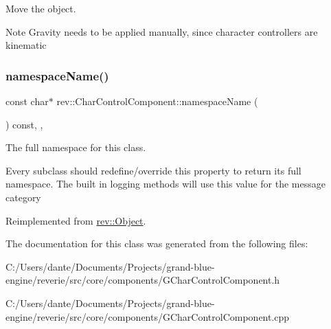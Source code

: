 Move the object. 

\begin{DoxyNote}{Note}
Gravity needs to be applied manually, since character controllers are kinematic 
\end{DoxyNote}
\mbox{\label{classrev_1_1_char_control_component_a62ac7aa35e708a0f0fcde627bababfd9}} 
\subsubsection{\texorpdfstring{namespaceName()}{namespaceName()}}
{\footnotesize\ttfamily const char$\ast$ rev\+::\+Char\+Control\+Component\+::namespace\+Name (\begin{DoxyParamCaption}{ }\end{DoxyParamCaption}) const\hspace{0.3cm}{\ttfamily [inline]}, {\ttfamily [override]}, {\ttfamily [virtual]}}



The full namespace for this class. 

Every subclass should redefine/override this property to return its full namespace. The built in logging methods will use this value for the message category 

Reimplemented from \mbox{\hyperlink{classrev_1_1_object_aaeb638d3e10f361c56c211a318a27f3d}{rev\+::\+Object}}.



The documentation for this class was generated from the following files\+:\begin{DoxyCompactItemize}
\item 
C\+:/\+Users/dante/\+Documents/\+Projects/grand-\/blue-\/engine/reverie/src/core/components/G\+Char\+Control\+Component.\+h\item 
C\+:/\+Users/dante/\+Documents/\+Projects/grand-\/blue-\/engine/reverie/src/core/components/G\+Char\+Control\+Component.\+cpp\end{DoxyCompactItemize}
